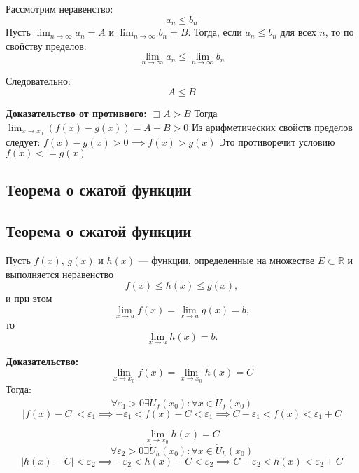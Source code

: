\documentclass{article}
\begin{document}
Рассмотрим неравенство:
\[
a_n \leq b_n
\]
Пусть \( \lim_{n \to \infty} a_n = A \) и \( \lim_{n \to \infty} b_n = B \). Тогда, если \( a_n \leq b_n \) для всех \( n \), то по свойству пределов:
\[
\lim_{n \to \infty} a_n \leq \lim_{n \to \infty} b_n
\]

Следовательно:
\[
A \leq B
\]

\textbf{Доказательство от противного:}
\(
    \sqsupset A > B
\)
Тогда 
\(
    \lim_{x \to x_0} (f(x) - g(x)) = A - B > 0
\)
Из арифметических свойств пределов следует:
\(
    f(x) - g(x) > 0 \implies f(x) > g(x)
\)
Это противоречит условию $f(x) <= g(x)$

\subsection*{Теорема о сжатой функции}


\subsection*{Теорема о сжатой функции}
Пусть \( f(x) \), \( g(x) \) и \( h(x) \) — функции, определенные на множестве \( E \subset \mathbb{R} \) и выполняется неравенство
\[
f(x) \leq h(x) \leq g(x),
\]
и при этом
\[
\lim_{x \to a} f(x) = \lim_{x \to a} g(x) = b,
\]
то
\[
\lim_{x \to a} h(x) = b.
\]

\textbf{Доказательство:}
\begin{equation}
    \lim_{x \to x_0} f(x) = \lim_{x \to x_0} h(x) = C
\end{equation}
Тогда:
\begin{equation}
    \forall \varepsilon_1 > 0 \exists \dot{U}_f (x_0) : \forall x \in \dot{U}_f (x_0)
\end{equation}
\begin{equation}
    |f(x) - C| < \varepsilon_1 \implies -\varepsilon_1 < f(x) - C < \varepsilon_1 \implies C - \varepsilon_1 < f(x) < \varepsilon_1 + C
\end{equation}

\begin{equation}
    \lim_{x \to x_0} h(x) = C
\end{equation}
\begin{equation}
    \forall \varepsilon_2 > 0 \exists \dot{U}_h (x_0) : \forall x \in \dot{U}_h (x_0)
\end{equation}
\begin{equation}
    |h(x) - C| < \varepsilon_2 \implies -\varepsilon_2 < h(x) - C < \varepsilon_2 \implies C - \varepsilon_2 < h(x) < \varepsilon_2 + C
\end{equation}
\end{document}
